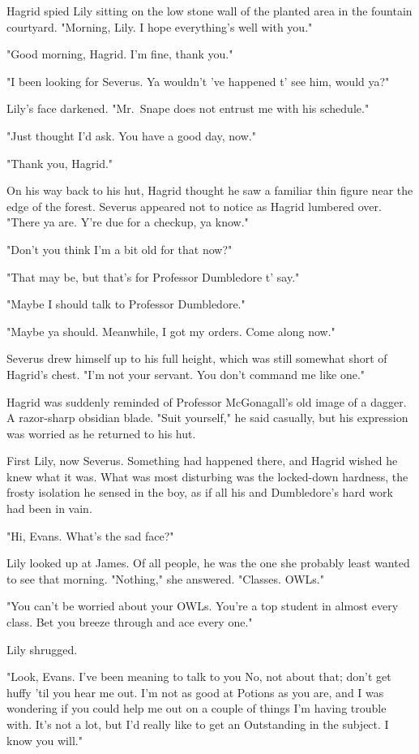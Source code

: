 Hagrid spied Lily sitting on the low stone wall of the planted area in the fountain courtyard. "Morning, Lily. I hope everything's well with you."

"Good morning, Hagrid. I'm fine, thank you."

"I been looking for Severus. Ya wouldn't 've happened t' see him, would ya?"

Lily's face darkened. "Mr.~Snape does not entrust me with his schedule."

"Just thought I'd ask. You have a good day, now."

"Thank you, Hagrid."

On his way back to his hut, Hagrid thought he saw a familiar thin figure near the edge of the forest. Severus appeared not to notice as Hagrid lumbered over. "There ya are. Y're due for a checkup, ya know."

"Don't you think I'm a bit old for that now?"

"That may be, but that's for Professor Dumbledore t' say."

"Maybe I should talk to Professor Dumbledore."

"Maybe ya should. Meanwhile, I got my orders. Come along now."

Severus drew himself up to his full height, which was still somewhat short of Hagrid's chest. "I'm not your servant. You don't command me like one."

Hagrid was suddenly reminded of Professor McGonagall's old image of a dagger. A razor-sharp obsidian blade. "Suit yourself," he said casually, but his expression was worried as he returned to his hut.

First Lily, now Severus. Something had happened there, and Hagrid wished he knew what it was. What was most disturbing was the locked-down hardness, the frosty isolation he sensed in the boy, as if all his and Dumbledore's hard work had been in vain.

"Hi, Evans. What's the sad face?"

Lily looked up at James. Of all people, he was the one she probably least wanted to see that morning. "Nothing," she answered. "Classes. OWLs."

"You can't be worried about your OWLs. You're a top student in almost every class. Bet you breeze through and ace every one."

Lily shrugged.

"Look, Evans. I've been meaning to talk to you{\el} No, not about that; don't get huffy 'til you hear me out. I'm not as good at Potions as you are, and I was wondering if you could help me out on a couple of things I'm having trouble with. It's not a lot, but I'd really like to get an Outstanding in the subject. I know you will."

